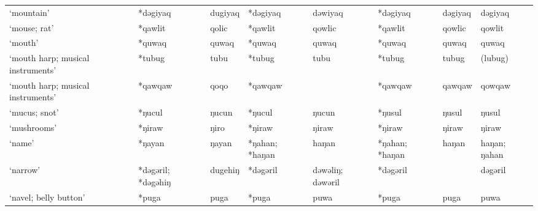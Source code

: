 \begin{landscape}
\begin{longtable}[c]{@{}p{3cm}<{\raggedright}p{2.75cm}<{\raggedright}p{2.75cm}<{\raggedright}p{2.75cm}<{\raggedright}p{2.75cm}<{\raggedright}p{2.75cm}<{\raggedright}p{2.75cm}<{\raggedright}p{2.75cm}<{\raggedright}@{}}
`mountain'                                           & *dəgiyaq           & dugiyaq                        & *dəgiyaq           & dəwiyaq                    & *dəgiyaq         & dəgiyaq                  & dəgiyaq                           \\
`mouse; rat'                                         & *qawlit            & qolic                          & *qawlit            & qowlic                     & *qawlit          & qowlic                   & qowlit                            \\
`mouth'                                              & *quwaq             & quwaq                          & *quwaq             & quwaq                      & *quwaq           & quwaq                    & quwaq                             \\
`mouth harp; musical instruments'                    & *tubug             & tubu                           & *tubug             & tubu                       & *tubug           & tubug                    & (lubug)                           \\
`mouth harp; musical instruments'                    & *qawqaw            & qoqo                           & *qawqaw            &                            & *qawqaw          & qawqaw                   & qowqaw                            \\
`mucus; snot'                                        & *ŋucul             & ŋucun                          & *ŋucul             & ŋucun                      & *ŋusul           & ŋusul                    & ŋusul                             \\
`mushrooms'                                          & *ŋiraw             & ŋiro                           & *ŋiraw             & ŋiraw                      & *ŋiraw           & ŋiraw                    & ŋiraw                             \\
`name'                                               & *ŋayan             & ŋayan                          & *ŋahan; *haŋan     & haŋan                      & *ŋahan; *haŋan   & haŋan                    & haŋan; ŋahan                      \\
`narrow'                                             & *dəgəril; *dəgəhiŋ & dugehiŋ                        & *dəgəril           & dəwəliŋ; dəwəril           & *dəgəril         &                          & dəgəril                           \\
`navel; belly button'                                & *puga              & puga                           & *puga              & puwa                       & *puga            & puga                     & puwa                              \\

\end{longtable}
\end{landscape}
